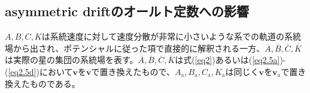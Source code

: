 
\subsection{asymmetric driftのオールト定数への影響}
$A,B,C,K$は系統速度に対して速度分散が非常に小さいような系での軌道の系統場から出され、ポテンシャルに従った項で直接的に解釈される一方、$\overline{A},\overline{B},\overline{C},\overline{K}$は実際の星の集団の系統場を表す。$\overline{A},\overline{B},\overline{C},\overline{K}$は式(\ref{eq2})あるいは(\ref{eq2.5a})-(\ref{eq2.5d})において$\pmb{v}$を$\pmb{\overline{v}}$で置き換えたもので、$A_{\mathrm{a}},B_{\mathrm{a}},C_{\mathrm{a}},K_{\mathrm{a}}$は同じく$\pmb{v}$を$\pmb{v}_{\mathrm{a}}$で置き換えたものである。

